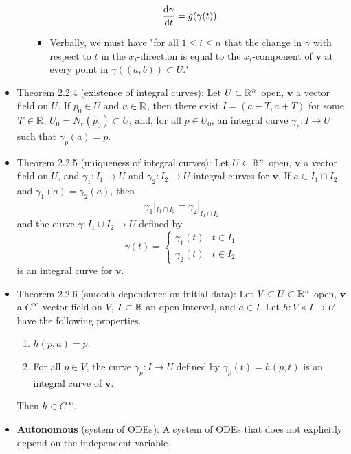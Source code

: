\documentclass[../notes.tex]{subfiles}
\begin{document}
\begin{itemize}
\begin{itemize}
\begin{equation*}
            \dv{\gamma}{t} = g(\gamma(t))
        \end{equation*}
        \begin{itemize}
            \item Verbally, we must have "for all $1\leq i\leq n$ that the change in $\gamma$ with respect to $t$ in the $x_i$-direction is equal to the $x_i$-component of $\bm{v}$ at every point in $\gamma((a,b))\subset U$."
        \end{itemize}
    \end{itemize}
    \item Theorem 2.2.4 (existence of integral curves): Let $U\subset\mathbb{R}^n$ open, $\bm{v}$ a vector field on $U$. If $p_0\in U$ and $a\in\mathbb{R}$, then there exist $I=(a-T,a+T)$ for some $T\in\mathbb{R}$, $U_0=N_r(p_0)\subset U$, and, for all $p\in U_0$, an integral curve $\gamma_p:I\to U$ such that $\gamma_p(a)=p$.
    \item Theorem 2.2.5 (uniqueness of integral curves): Let $U\subset\mathbb{R}^n$ open, $\bm{v}$ a vector field on $U$, and $\gamma_1:I_1\to U$ and $\gamma_2:I_2\to U$ integral curves for $\bm{v}$. If $a\in I_1\cap I_2$ and $\gamma_1(a)=\gamma_2(a)$, then
    \begin{equation*}
        \gamma_1|_{I_1\cap I_2} = \gamma_2|_{I_1\cap I_2}
    \end{equation*}
    and the curve $\gamma:I_1\cup I_2\to U$ defined by
    \begin{equation*}
        \gamma(t) =
        \begin{cases}
            \gamma_1(t) & t\in I_1\\
            \gamma_2(t) & t\in I_2
        \end{cases}
    \end{equation*}
    is an integral curve for $\bm{v}$.
    \item Theorem 2.2.6 (smooth dependence on initial data): Let $V\subset U\subset\mathbb{R}^n$ open, $\bm{v}$ a $C^\infty$-vector field on $V$, $I\subset\mathbb{R}$ an open interval, and $a\in I$. Let $h:V\times I\to U$ have the following properties.
    \begin{enumerate}
        \item $h(p,a)=p$.
        \item For all $p\in V$, the curve $\gamma_p:I\to U$ defined by $\gamma_p(t)=h(p,t)$ is an integral curve of $\bm{v}$.
    \end{enumerate}
    Then $h\in C^\infty$.
    \item \textbf{Autonomous} (system of ODEs): A system of ODEs that does not explicitly depend on the independent variable.

\end{itemize}
\end{document}
